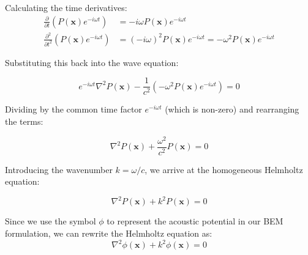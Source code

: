 Calculating the time derivatives:
\begin{align}
    \frac{\partial}{\partial t} \left( P(\mathbf{x}) e^{-i \omega t} \right) &= -i \omega P(\mathbf{x}) e^{-i \omega t} \\
    \frac{\partial^2}{\partial t^2} \left( P(\mathbf{x}) e^{-i \omega t} \right) &= (-i \omega)^2 P(\mathbf{x}) e^{-i \omega t} = -\omega^2 P(\mathbf{x}) e^{-i \omega t}
\end{align}

Substituting this back into the wave equation:

\begin{equation}
    e^{-i \omega t} \nabla^2 P(\mathbf{x}) - \frac{1}{c^2} (-\omega^2 P(\mathbf{x}) e^{-i \omega t}) = 0
\end{equation}

Dividing by the common time factor $e^{-i \omega t}$ (which is non-zero) and rearranging the terms:

\begin{equation}
    \nabla^2 P(\mathbf{x}) + \frac{\omega^2}{c^2} P(\mathbf{x}) = 0
\end{equation}


Introducing the wavenumber $k = \omega / c$, we arrive at the homogeneous Helmholtz equation:

\begin{equation}
    \nabla^2 P(\mathbf{x}) + k^2 P(\mathbf{x}) = 0
    \label{eq:helmholtz}
\end{equation}


Since we use the symbol $\phi$ to represent the acoustic potential in our BEM formulation, we can rewrite the Helmholtz equation as:
\begin{equation}
    \nabla^2 \phi(\mathbf{x}) + k^2 \phi(\mathbf{x}) = 0
    \label{eq:helmholtz_phi}
\end{equation}